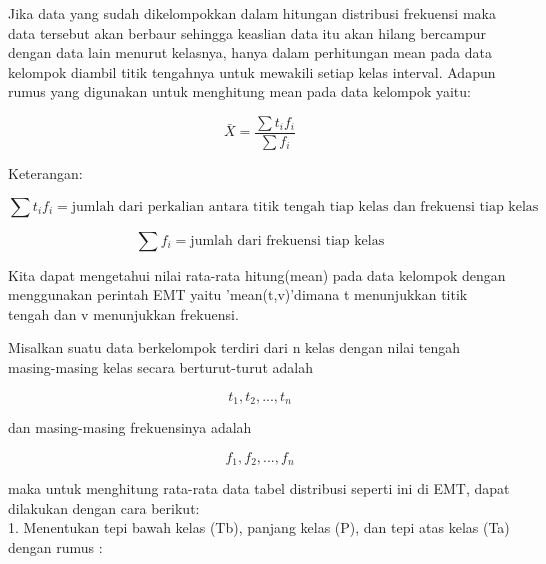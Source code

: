 \documentclass[a4paper,10pt]{article}
\begin{document}
\begin{eulernotebook}
\begin{eulercomment}
\end{eulercomment}
\begin{eulercomment}
Jika data yang sudah dikelompokkan dalam hitungan distribusi frekuensi
maka data tersebut akan berbaur sehingga keaslian data itu akan hilang
bercampur dengan data lain menurut kelasnya, hanya dalam perhitungan
mean pada data kelompok diambil titik tengahnya untuk mewakili setiap
kelas interval. Adapun rumus yang digunakan untuk menghitung mean pada
data kelompok yaitu:\\
\end{eulercomment}
\begin{eulerformula}
\[
\bar{X} = \frac{\sum t_i f_i}{\sum f_i}
\]
\end{eulerformula}
\begin{eulerttcomment}
   Keterangan:
\end{eulerttcomment}
\begin{eulerformula}
\[
  \sum t_i f_i = \mbox{jumlah dari perkalian antara titik tengah tiap kelas dan frekuensi tiap kelas}
\]
\end{eulerformula}
\begin{eulerformula}
\[
\sum f_i = \mbox{jumlah dari frekuensi tiap kelas}
\]
\end{eulerformula}
\begin{eulercomment}
Kita dapat mengetahui nilai rata-rata hitung(mean) pada data kelompok
dengan menggunakan perintah EMT yaitu 'mean(t,v)'dimana t menunjukkan
titik tengah dan v menunjukkan frekuensi.

Misalkan suatu data berkelompok terdiri dari n kelas dengan nilai
tengah masing-masing kelas secara berturut-turut adalah\\
\end{eulercomment}
\begin{eulerformula}
\[
t_1,t_2,...,t_n
\]
\end{eulerformula}
\begin{eulercomment}
dan masing-masing frekuensinya adalah\\
\end{eulercomment}
\begin{eulerformula}
\[
f_1,f_2,...,f_n
\]
\end{eulerformula}
\begin{eulercomment}
maka untuk menghitung rata-rata data tabel distribusi seperti ini di
EMT, dapat dilakukan dengan cara berikut:\\
1. Menentukan tepi bawah kelas (Tb), panjang kelas (P), dan tepi atas
kelas (Ta) dengan rumus :


\end{eulercomment}
\end{eulernotebook}
\end{document}
